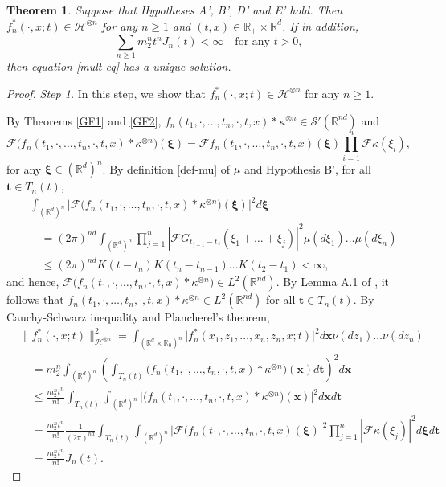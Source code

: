 \documentclass[12pt]{article}
\newtheorem{theorem}{Theorem}[section]
\def\cF{\mathcal{F}}
\def\cH{\mathcal{H}}
\def\cS{\mathcal{S}}
\def\bR{\mathbb{R}}
\def\k{\kappa}
\begin{document}
\begin{theorem}
Suppose that Hypotheses A', B', D' and E' hold. Then $f_n^{*}(\cdot,x;t)\in \cH^{\otimes n}$ for any $n\geq 1$ and $(t,x)\in \bR_{+}\times \bR^d$. If in addition,
\begin{equation}
\label{sum-Jn}
\sum_{n\geq 1}m_2^n t^n J_n(t)<\infty \quad \mbox{for any $t>0$},
\end{equation}
then equation \eqref{mult-eq} has a unique solution.
\end{theorem}




\begin{proof}
{\em Step 1.} In this step, we show that 
$f_n^{*}(\cdot,x;t)\in \cH^{\otimes n}$ for any $n\geq 1$. 

 By Theorems \ref{GF1} and \ref{GF2}, $f_n(t_1,\cdot,\ldots, t_n,\cdot,t,x)*\k^{\otimes n}\in \cS'(\bR^{nd})$ and
\[
\cF \big(f_n(t_1,\cdot,\ldots,t_n,\cdot, t,x)*\k^{\otimes n}\big)(\pmb{\xi})=\cF f_n(t_1,\cdot,\ldots,t_n,\cdot,t,x)(\pmb{\xi}) \prod_{i=1}^{n}\cF \k(\xi_i),
\]
for any $\pmb{\xi}\in (\bR^d)^n$. By definition \eqref{def-mu} of $\mu$ and Hypothesis B', for all  $\pmb{t} \in T_n(t)$,
\begin{align}
\nonumber
& \int_{(\bR^d)^n} \Big|\cF \big(f_n(t_1,\cdot,\ldots,t_n,\cdot,t,x)*\k^{\otimes n}\big)(\pmb{\xi})\Big|^2 d\pmb{\xi}\\
\nonumber
& \quad =(2\pi)^{nd}\int_{(\bR^d)^n} \prod_{j=1}^{n}|\cF G_{t_{j+1}-t_j}(\xi_1+\ldots+\xi_j)|^2 \mu(d\xi_1)\ldots \mu(d\xi_n)\\
\label{Jn1}
& \quad \leq (2\pi)^{nd} K(t-t_n) K(t_n-t_{n-1}) \ldots K(t_2-t_1)<\infty,
\end{align}
and hence,
$\cF \big(f_n(t_1,\cdot,\ldots,t_n,\cdot,t,x)*\k^{\otimes n}\big) \in L^2(\bR^{nd})$. By Lemma A.1 of \cite{BJ26}, it follows that $f_n(t_1,\cdot,\ldots,t_n,\cdot,t,x)*\k^{\otimes n} \in L^2(\bR^{nd})$ for all $\pmb{t} \in T_n(t)$. By Cauchy-Schwarz inequality and Plancherel's theorem,
\begin{align*}
& \|f_n^*(\cdot,x;t)\|_{\cH^{\otimes n}}^2  = \int_{(\bR^d \times \bR_0)^n} \big|f_n^*(x_1,z_1,\ldots,x_n,z_n,x;t)\big|^2 d\pmb{x} \nu(dz_1) \ldots \nu(dz_n)\\
& \quad  =m_2^n\int_{(\bR^{d})^n} \left(\int_{T_n(t)} \big(f_n(t_1,\cdot,\ldots,t_n,\cdot,t,x)*\k^{\otimes n}\big)(\pmb{x}) d\pmb{t}\right)^2 d\pmb{x}\\
& \quad \leq  \frac{m_2^n t^n}{n!} \int_{T_n(t)}  \int_{(\bR^{d})^n}\big| \big(f_n(t_1,\cdot,\ldots,t_n,\cdot,t,x)*\k^{\otimes n}\big) (\pmb{x}) \big|^2 d\pmb{x} d\pmb{t} \\
&  \quad   = \frac{m_2^n t^n}{n!} \frac{1}{(2\pi)^{nd}}\int_{T_n(t)} \int_{(\bR^{d})^n} \Big|\cF \big(f_n(t_1,\cdot,\ldots,t_n,\cdot,t,x)(\pmb{\xi})\Big|^2 \prod_{j=1}^{n}|\cF\k(\xi_j)|^2 d\pmb{\xi}d\pmb{t} \\
& \quad =\frac{ m_2^n  t^n}{n!} J_n(t).
\end{align*}


\end{proof}
\end{document}
